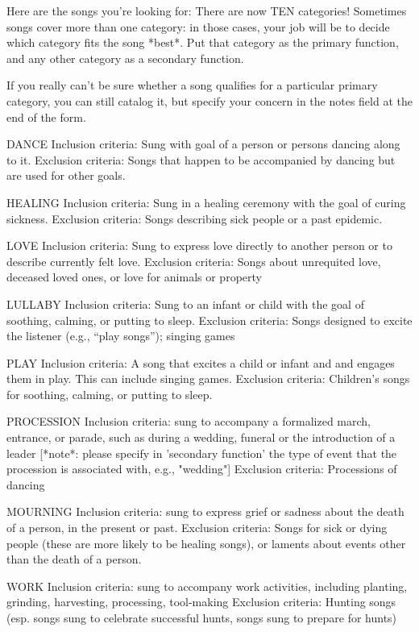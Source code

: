 Here are the songs you're looking for:
There are now TEN categories! Sometimes songs cover more than one category: in those cases, your job will be to decide which category fits the song *best*. Put that category as the primary function, and any other category as a secondary function.

If you really can't be sure whether a song qualifies for a particular primary category, you can still catalog it, but specify your concern in the notes field at the end of the form.

DANCE
Inclusion criteria: Sung with goal of a person or persons dancing along to it.
Exclusion criteria: Songs that happen to be accompanied by dancing but are used for other goals.

HEALING
Inclusion criteria: Sung in a healing ceremony with the goal of curing sickness.
Exclusion criteria: Songs describing sick people or a past epidemic.

LOVE
Inclusion criteria: Sung to express love directly to another person or to describe currently felt love.
Exclusion criteria: Songs about unrequited love, deceased loved ones, or love for animals or property

LULLABY
Inclusion criteria: Sung to an infant or child with the goal of soothing, calming, or putting to sleep.
Exclusion criteria: Songs designed to excite the listener (e.g., “play songs”); singing games

PLAY
Inclusion criteria: A song that excites a child or infant and and engages them in play. This can include singing games.
Exclusion criteria: Children's songs for soothing, calming, or putting to sleep.

PROCESSION
Inclusion criteria: sung to accompany a formalized march, entrance, or parade, such as during a wedding, funeral or the introduction of a leader [*note*: please specify in 'secondary function' the type of event that the procession is associated with, e.g., "wedding"]
Exclusion criteria: Processions of dancing

MOURNING
Inclusion criteria: sung to express grief or sadness about the death of a person, in the present or past.
Exclusion criteria: Songs for sick or dying people (these are more likely to be healing songs), or laments about events other than the death of a person.

WORK
Inclusion criteria: sung to accompany work activities, including planting, grinding, harvesting, processing, tool-making
Exclusion criteria: Hunting songs (esp. songs sung to celebrate successful hunts, songs sung to prepare for hunts)

